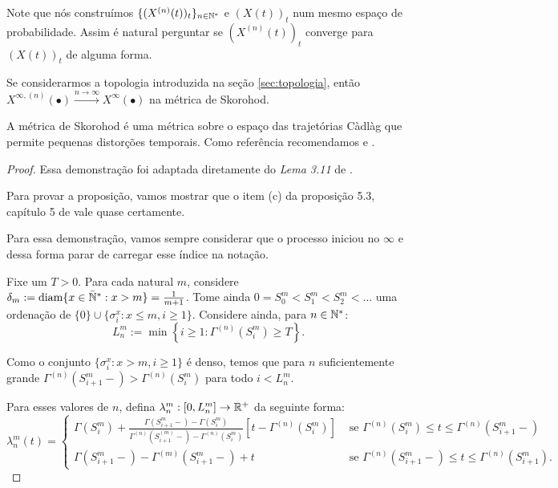 Note que nós construímos $\{(X^{(n)}(t))_t\}_{n \in {\mathbb{N^*}}}$ e $(X(t))_t$
num mesmo espaço de probabilidade. Assim é natural perguntar se
$(X^{(n)}(t))_t$ converge para $(X(t))_t$ de alguma forma.

\begin{teorema}
  \label{teo:convergencia}
  Se considerarmos a topologia introduzida na seção
  \ref{sec:topologia}, então $X^{\infty, (n)} (\bullet) \xrightarrow{n \to
    \infty} X^\infty(\bullet)$ \qc na métrica de Skorohod.
\end{teorema}

A métrica de Skorohod é uma métrica sobre o espaço das trajetórias
Càdlàg que permite pequenas distorções temporais. Como
referência recomendamos \cite{billingsley:99} e \cite{ethier:86}.

\begin{proof}
  Essa demonstração foi adaptada diretamente do \emph{Lema 3.11} de
  \cite{fontes:08}.

  Para provar a proposição, vamos mostrar que o item (c) da proposição
  5.3, capítulo 5 de \cite{ethier:86} vale quase certamente.

  Para essa demonstração, vamos sempre considerar que o processo
  iniciou no $\infty$ e dessa forma parar de carregar esse índice na
  notação.

  Fixe um $T > 0$. Para cada natural $m$, considere $\delta_m :=
  {\mathrm{diam}}\{ x \in {\mathbb{\bar{N}^*}}: x > m \} = \frac{1}{m+1}$. Tome ainda $0 = S_0^m
  < S_1^m < S_2^m < \ldots $ uma ordenação de $\{0\}\cup\{ \sigma^x_i
  : x \leq m, i \geq 1\}$. Considere ainda, para $n \in {\mathbb{N^*}}$:
  \begin{displaymath}
    L^m_n := \min \left\{ i \geq 1: \Gamma^{(n)}(S^m_i) \geq T \right\}.
  \end{displaymath}

  Como o conjunto $\{\sigma_i^x: x > m, i\geq 1\}$ é denso, temos
  que para $n$ suficientemente grande $\Gamma^{(n)}(S^m_{i+1}-) >
  \Gamma^{(n)}(S^m_i)$ para todo $i < L^m_n$.

  Para esses valores de $n$, defina $\lambda_n^m: [0, L_n^m] \to {\mathbb{R}}^+$
  da seguinte forma:
  \begin{displaymath}
    \lambda_n^m(t) = \begin{cases}
      \Gamma(S_i^m) + \frac{\Gamma(S_{i+1}^m-) - \Gamma(S_i^m)}
      {\Gamma^{(n)}(S_{i+1}^{(m)} -) - \Gamma^{(n)}(S_i^m)}
      \left[t - \Gamma^{(n)}(S_i^m)\right]
      & \textrm{ se }
      \Gamma^{(n)}(S_i^m) \leq t \leq \Gamma^{(n)}(S_{i+1}^m-) \\
      \Gamma(S_{i+1}^m-) - \Gamma^{(m)}(S_{i+1}^m-) + t
      & \textrm{ se }
      \Gamma^{(n)}(S_{i+1}^m-) \leq t \leq \Gamma^{(n)}(S_{i+1}^m).
    \end{cases}
  \end{displaymath}


\end{proof}
